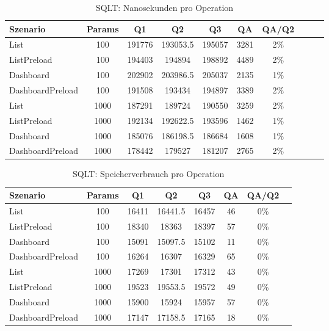 
\begin{table}[ht]
\centering
\caption{SQLT: Nanosekunden pro Operation}
\begin{tabular}{lccccccccc}
\toprule
Szenario & Params & Q1 & Q2 & Q3 & QA & QA/Q2 \\
\midrule
	List & 100 & 191776 & 193053.5 & 195057 & 3281 & 2\% \\
	ListPreload & 100 & 194403 & 194894 & 198892 & 4489 & 2\% \\
	Dashboard & 100 & 202902 & 203986.5 & 205037 & 2135 & 1\% \\
	DashboardPreload & 100 & 191508 & 193434 & 194897 & 3389 & 2\% \\
	List & 1000 & 187291 & 189724 & 190550 & 3259 & 2\% \\
	ListPreload & 1000 & 192134 & 192622.5 & 193596 & 1462 & 1\% \\
	Dashboard & 1000 & 185076 & 186198.5 & 186684 & 1608 & 1\% \\
	DashboardPreload & 1000 & 178442 & 179527 & 181207 & 2765 & 2\% \\
\bottomrule
\end{tabular}
\label{tab:benchmark_sqlt_nsperop}
\end{table}
	
\begin{table}[ht]
\centering
\caption{SQLT: Speicherverbrauch pro Operation}
\begin{tabular}{lccccccc}
\toprule
Szenario & Params & Q1 & Q2 & Q3 & QA & QA/Q2 \\
\midrule
	List & 100 & 16411 & 16441.5 & 16457 & 46 & 0\% \\
	ListPreload & 100 & 18340 & 18363 & 18397 & 57 & 0\% \\
	Dashboard & 100 & 15091 & 15097.5 & 15102 & 11 & 0\% \\
	DashboardPreload & 100 & 16264 & 16307 & 16329 & 65 & 0\% \\
	List & 1000 & 17269 & 17301 & 17312 & 43 & 0\% \\
	ListPreload & 1000 & 19523 & 19553.5 & 19572 & 49 & 0\% \\
	Dashboard & 1000 & 15900 & 15924 & 15957 & 57 & 0\% \\
	DashboardPreload & 1000 & 17147 & 17158.5 & 17165 & 18 & 0\% \\
\bottomrule
\end{tabular}
\label{tab:benchmark_sqlt_bytesperop}
\end{table}
	

